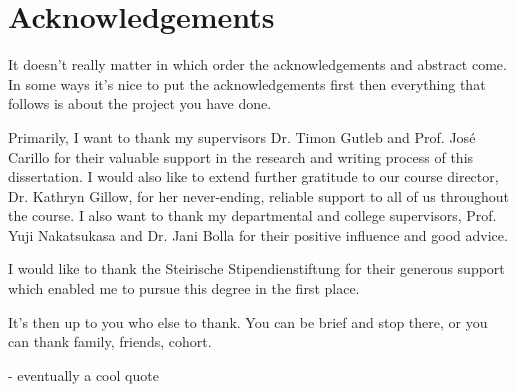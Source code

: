 \chapter*{Acknowledgements}
It doesn't really matter in which order the acknowledgements and abstract come.
In some ways it's nice to put the acknowledgements first then everything that follows is about the project you have done.

Primarily, I want to thank my supervisors Dr. Timon Gutleb and Prof. José Carillo for their valuable support in the research and writing process of this dissertation.
I would also like to extend further gratitude to our course director, Dr. Kathryn Gillow, for her never-ending, reliable support to all of us throughout the course.
I also want to thank my departmental and college supervisors, Prof. Yuji Nakatsukasa and Dr. Jani Bolla for their positive influence and good advice.

I would like to thank the Steirische Stipendienstiftung for their generous support which enabled me to pursue this degree in the first place.

It's then up to you who else to thank. You can be brief and stop there, or you can thank family, friends, cohort.

- eventually a cool quote
